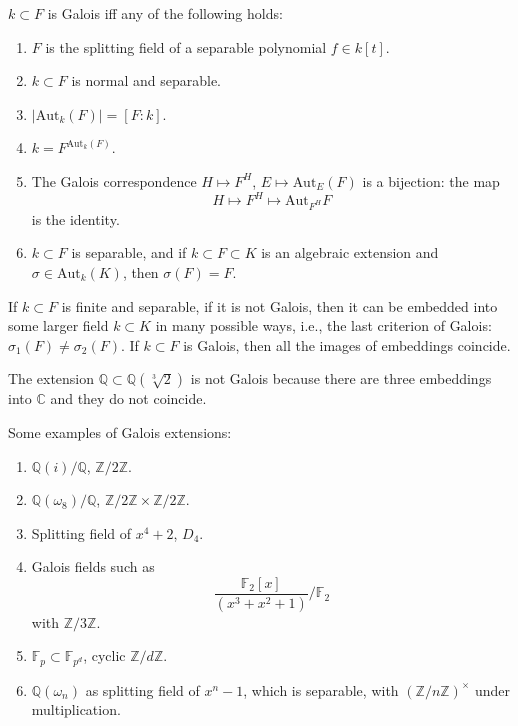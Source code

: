 \documentclass[openany]{book}
\newcommand{\Z}{\mathbb{Z}}
\newcommand{\C}{\mathbb{C}}
\newcommand{\F}{\mathbb{F}}
\newcommand{\Q}{\mathbb{Q}}
\newcommand{\aut}{\text{Aut}}
\newcommand{\om}{\omega}
\begin{document}
\begin{defn}
    $k\subset F$ is Galois iff any of the following holds:
    \begin{enumerate}
        \item $F$ is the splitting field of a separable polynomial $f\in k[t]$.
        \item $k\subset F$ is normal and separable.
        \item $|\aut_k(F)|=[F:k]$.
        \item $k=F^{\aut_k(F)}$.
        \item The Galois correspondence $H\mapsto F^H$, $E\mapsto\aut_E(F)$ is a bijection: the map 
        \begin{equation*}
            H\mapsto F^H\mapsto \aut_{F^H}F
        \end{equation*}
        is the identity.
        \item $k\subset F$ is separable, and if $k\subset F\subset K$ is an algebraic extension and $\sigma\in\aut_k(K)$, then $\sigma(F)=F$.
    \end{enumerate}
\end{defn}


\begin{prop}
    If $k\subset F$ is finite and separable, if it is not Galois, then it can be embedded into some larger field $k\subset K$ in many possible ways, i.e., the last criterion of Galois: $\sigma_1(F)\neq\sigma_2(F)$. If $k\subset F$ is Galois, then all the images of embeddings coincide.
\end{prop}

\begin{example}
    The extension $\Q\subset\Q(\sqrt[3]{2})$ is not Galois because there are three embeddings into $\C$ and they do not coincide.
\end{example}


\begin{example}
    Some examples of Galois extensions: 
    \begin{enumerate}
        \item $\Q(i)/\Q$, $\Z/2\Z$.
        \item $\Q(\om_8)/\Q$, $\Z/2\Z\times\Z/2\Z$.
        \item Splitting field of $x^4+2$, $D_4$.
        \item Galois fields such as 
        \begin{equation*}
            \frac{\F_2[x]}{(x^3+x^2+1)}/\F_2
        \end{equation*}
        with $\Z/3\Z$.
        \item $\F_p\subset\F_{p^d}$, cyclic $\Z/d\Z$.
        \item $\Q(\om_n)$ as splitting field of $x^n-1$, which is separable, with $(\Z/n\Z)^\times$ under multiplication.
    \end{enumerate}
\end{example}
\end{document}
